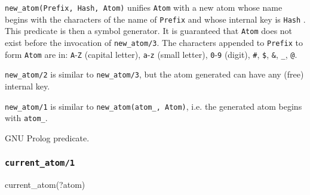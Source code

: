 \Description

\texttt{new\_atom(Prefix, Hash, Atom)} unifies \texttt{Atom} with a new atom
whose name begins with the characters of the name of \texttt{Prefix} and
whose internal key is \texttt{Hash} . This predicate is
then a symbol generator. It is guaranteed that \texttt{Atom} does not exist
before the invocation of \texttt{new\_atom/3}. The characters appended to
\texttt{Prefix} to form \texttt{Atom} are in: \texttt{A}-\texttt{Z} (capital
letter), \texttt{a}-\texttt{z} (small letter), \texttt{0}-\texttt{9}
(digit), \texttt{\#}, \texttt{\$}, \texttt{\&}, \texttt{\_}, \texttt{@}.

\texttt{new\_atom/2} is similar to \texttt{new\_atom/3}, but the atom
generated can have any (free) internal key.

\texttt{new\_atom/1} is similar to \texttt{new\_atom(atom\_, Atom)}, i.e.
the generated atom begins with \texttt{atom\_}.

\begin{PlErrors}







\end{PlErrors}

\Portability

GNU Prolog predicate.

\subsubsection{\texttt{current\_atom/1}}
\label{current-atom/2}

\begin{TemplatesOneCol}
current\_atom(?atom)

\end{TemplatesOneCol}

\Description

